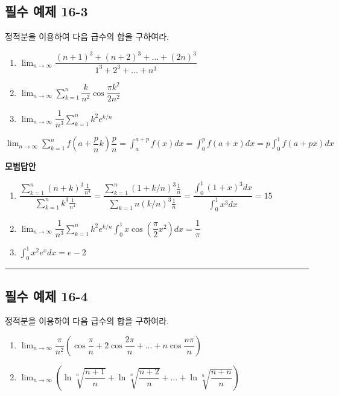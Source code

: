 \documentclass[a4paper,11pt]{article}
\begin{document}
\subsection*{필수 예제 16-3}
정적분을 이용하여 다음 급수의 합을 구하여라. 
\begin{enumerate}[label=(\arabic*)]
    \item $\displaystyle \lim_{n \to \infty} \dfrac{(n+1)^3 + (n+2)^3 + \dots + (2n)^3}{1^3 + 2^3 + \dots + n^3}$
    \item $\displaystyle \lim_{n \to \infty} \sum_{k=1}^{n} \dfrac{k}{n^2} \cos \dfrac{\pi k^2}{2n^2}$
    \item $\displaystyle \lim_{n \to \infty} \dfrac{1}{n^3} \sum_{k=1}^{n} k^2 e^{k/n}$
\end{enumerate}

\begin{studybox}
$\displaystyle \lim_{n \to \infty} \sum_{k=1}^{n} f\left(a + \dfrac{p}{n}k\right) \dfrac{p}{n}=\displaystyle \int_{a}^{a+p} f(x) dx=\displaystyle \int_{0}^{p} f(a+x) dx=\displaystyle p \int_{0}^{1} f(a+px) dx$
\end{studybox}

\textbf{모범답안} \\
\begin{enumerate}[label=(\arabic*)]
    \item $\displaystyle \dfrac{\sum_{k=1}^{n} (n+k)^3 \frac{1}{n^4}}{\sum_{k=1}^{n} k^3 \frac{1}{n^4}} = \dfrac{\sum_{k=1}^{n}(1+k/n)^3\frac{1}{n}}{\sum_{k=1}{n}(k/n)^3 \frac{1}{n}}=\dfrac{\int_0^1 (1+x)^3 dx}{\int_0^1 x^3 dx} = 15$
    \item $\displaystyle \lim_{n \to \infty} \dfrac{1}{n^3} \sum_{k=1}^{n} k^2 e^{k/n}$$\displaystyle \int_0^1 x \cos(\dfrac{\pi}{2}x^2) dx = \dfrac{1}{\pi}$
    \item $\displaystyle \int_0^1 x^2 e^x dx = e-2$ 
\end{enumerate}
 
\vspace{0.5cm}
\hrule
\vspace{0.5cm}

\subsection*{필수 예제 16-4}
정적분을 이용하여 다음 급수의 합을 구하여라. 
\begin{enumerate}[label=(\arabic*)]
    \item $\displaystyle \lim_{n \to \infty} \dfrac{\pi}{n^2} (\cos\dfrac{\pi}{n} + 2\cos\dfrac{2\pi}{n} + \dots + n\cos\dfrac{n\pi}{n})$
    \item $\displaystyle \lim_{n \to \infty} (\ln \sqrt[n]{\dfrac{n+1}{n}} + \ln \sqrt[n]{\dfrac{n+2}{n}} + \dots + \ln \sqrt[n]{\dfrac{n+n}{n}})$
\end{enumerate}
\end{document}

